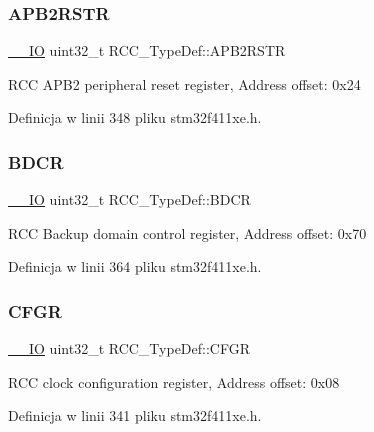 \subsubsection{\texorpdfstring{A\+P\+B2\+R\+S\+TR}{APB2RSTR}}
{\footnotesize\ttfamily \hyperlink{core__sc300_8h_aec43007d9998a0a0e01faede4133d6be}{\+\_\+\+\_\+\+IO} uint32\+\_\+t R\+C\+C\+\_\+\+Type\+Def\+::\+A\+P\+B2\+R\+S\+TR}

R\+CC A\+P\+B2 peripheral reset register, Address offset\+: 0x24 

Definicja w linii 348 pliku stm32f411xe.\+h.

\mbox{\label{struct_r_c_c___type_def_a05be375db50e8c9dd24fb3bcf42d7cf1}} 
\subsubsection{\texorpdfstring{B\+D\+CR}{BDCR}}
{\footnotesize\ttfamily \hyperlink{core__sc300_8h_aec43007d9998a0a0e01faede4133d6be}{\+\_\+\+\_\+\+IO} uint32\+\_\+t R\+C\+C\+\_\+\+Type\+Def\+::\+B\+D\+CR}

R\+CC Backup domain control register, Address offset\+: 0x70 

Definicja w linii 364 pliku stm32f411xe.\+h.

\mbox{\label{struct_r_c_c___type_def_a0721b1b729c313211126709559fad371}} 
\subsubsection{\texorpdfstring{C\+F\+GR}{CFGR}}
{\footnotesize\ttfamily \hyperlink{core__sc300_8h_aec43007d9998a0a0e01faede4133d6be}{\+\_\+\+\_\+\+IO} uint32\+\_\+t R\+C\+C\+\_\+\+Type\+Def\+::\+C\+F\+GR}

R\+CC clock configuration register, Address offset\+: 0x08 

Definicja w linii 341 pliku stm32f411xe.\+h.

\mbox{\label{struct_r_c_c___type_def_aeadf3a69dd5795db4638f71938704ff0}} 
